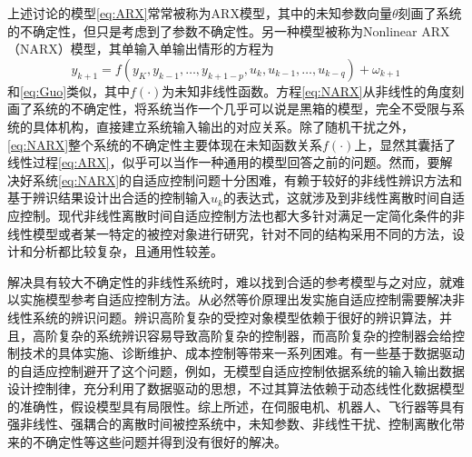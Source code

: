 上述讨论的模型\eqref{eq:ARX}常常被称为ARX模型，其中的未知参数向量$\theta$刻画了系统的不确定性，但只是考虑到了参数不确定性。另一种模型被称为Nonlinear ARX（NARX）模型，其单输入单输出情形的方程为
\begin{equation}%
\label{eq:NARX}
y_{k+1} = f(y_{K},y_{k-1},\ldots,y_{k+1-p},u_{k},u_{k-1},\ldots,u_{k-q})+\omega_{k+1}
\end{equation}
和\eqref{eq:Guo}类似，其中$f(\cdot)$为未知非线性函数。方程\eqref{eq:NARX}从非线性的角度刻画了系统的不确定性，将系统当作一个几乎可以说是黑箱的模型，完全不受限与系统的具体机构，直接建立系统输入输出的对应关系。除了随机干扰之外，\eqref{eq:NARX}整个系统的不确定性主要体现在未知函数关系$f(\cdot)$上，显然其囊括了线性过程\eqref{eq:ARX}，似乎可以当作一种通用的模型回答之前的问题。然而，要解决好系统\eqref{eq:NARX}的自适应控制问题十分困难，有赖于较好的非线性辨识方法和基于辨识结果设计出合适的控制输入$u_{k}$的表达式，这就涉及到非线性离散时间自适应控制。现代非线性离散时间自适应控制方法也都大多针对满足一定简化条件的非线性模型或者某一特定的被控对象进行研究，针对不同的结构采用不同的方法，设计和分析都比较复杂，且通用性较差。

解决具有较大不确定性的非线性系统时，难以找到合适的参考模型与之对应，就难以实施模型参考自适应控制方法。从必然等价原理出发实施自适应控制需要解决非线性系统的辨识问题。辨识高阶复杂的受控对象模型依赖于很好的辨识算法，并且，高阶复杂的系统辨识容易导致高阶复杂的控制器，而高阶复杂的控制器会给控制技术的具体实施、诊断维护、成本控制等带来一系列困难。有一些基于数据驱动的自适应控制避开了这个问题，例如，无模型自适应控制依据系统的输入输出数据设计控制律，充分利用了数据驱动的思想，不过其算法依赖于动态线性化数据模型的准确性，假设模型具有局限性。综上所述，在伺服电机、机器人、飞行器等具有强非线性、强耦合的离散时间被控系统中，未知参数、非线性干扰、控制离散化带来的不确定性等这些问题并得到没有很好的解决。


